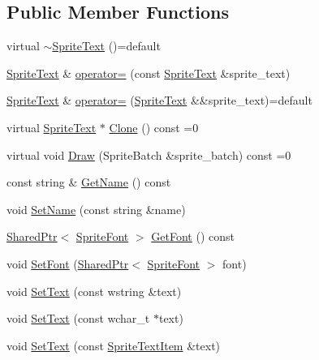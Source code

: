 \subsection*{Public Member Functions}
\begin{DoxyCompactItemize}
\item 
virtual \hyperlink{classmage_1_1_sprite_text_a0a231f260bb855b7be3280aa74a3e5c6}{$\sim$\+Sprite\+Text} ()=default
\item 
\hyperlink{classmage_1_1_sprite_text}{Sprite\+Text} \& \hyperlink{classmage_1_1_sprite_text_acc41212e9847babd95afa68aedf2ad42}{operator=} (const \hyperlink{classmage_1_1_sprite_text}{Sprite\+Text} \&sprite\+\_\+text)
\item 
\hyperlink{classmage_1_1_sprite_text}{Sprite\+Text} \& \hyperlink{classmage_1_1_sprite_text_a48e9d2fdda8bf2f8847a425444df980c}{operator=} (\hyperlink{classmage_1_1_sprite_text}{Sprite\+Text} \&\&sprite\+\_\+text)=default
\item 
virtual \hyperlink{classmage_1_1_sprite_text}{Sprite\+Text} $\ast$ \hyperlink{classmage_1_1_sprite_text_ac4edf927911a9fb8e5c3a674b217637a}{Clone} () const =0
\item 
virtual void \hyperlink{classmage_1_1_sprite_text_a45d5ac8410d5a46b26e8491946a2ad9e}{Draw} (Sprite\+Batch \&sprite\+\_\+batch) const =0
\item 
const string \& \hyperlink{classmage_1_1_sprite_text_ab9f289c7c70988da6acf031108ad4934}{Get\+Name} () const
\item 
void \hyperlink{classmage_1_1_sprite_text_a48324e6a5f896b11701ad5b0f8ab3ad1}{Set\+Name} (const string \&name)
\item 
\hyperlink{namespacemage_a1e01ae66713838a7a67d30e44c67703e}{Shared\+Ptr}$<$ \hyperlink{classmage_1_1_sprite_font}{Sprite\+Font} $>$ \hyperlink{classmage_1_1_sprite_text_a1c80933525f87fe4dced9479c1b79764}{Get\+Font} () const
\item 
void \hyperlink{classmage_1_1_sprite_text_a8e753dcd210b1fdf9c5399a9f0f3415d}{Set\+Font} (\hyperlink{namespacemage_a1e01ae66713838a7a67d30e44c67703e}{Shared\+Ptr}$<$ \hyperlink{classmage_1_1_sprite_font}{Sprite\+Font} $>$ font)
\item 
void \hyperlink{classmage_1_1_sprite_text_ac33e512ab29554a306ada9a378ab00eb}{Set\+Text} (const wstring \&text)
\item 
void \hyperlink{classmage_1_1_sprite_text_a03d5012e2812d422a1285a4a0abb104f}{Set\+Text} (const wchar\+\_\+t $\ast$text)
\item 
void \hyperlink{classmage_1_1_sprite_text_ab9f28cf44b29b8489794938a8965f104}{Set\+Text} (const \hyperlink{structmage_1_1_sprite_text_item}{Sprite\+Text\+Item} \&text)

\end{DoxyCompactItemize}
